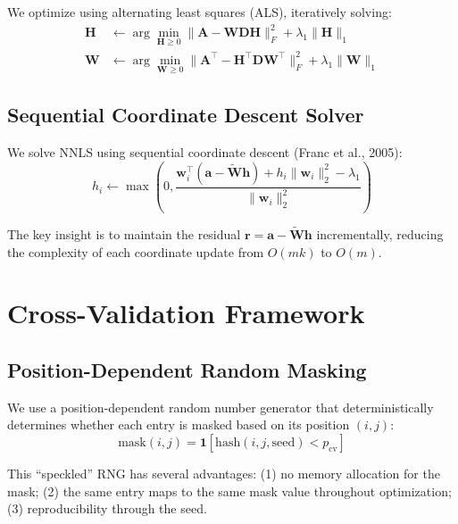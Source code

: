 \documentclass[11pt]{article}
\begin{document}
We optimize using alternating least squares (ALS), iteratively solving:
\begin{align}
  \mathbf{H} &\leftarrow \arg\min_{\mathbf{H} \geq 0} 
  \|\mathbf{A} - \mathbf{W}\mathbf{D}\mathbf{H}\|_F^2 + \lambda_1\|\mathbf{H}\|_1 \\
  \mathbf{W} &\leftarrow \arg\min_{\mathbf{W} \geq 0} 
  \|\mathbf{A}^\top - \mathbf{H}^\top\mathbf{D}\mathbf{W}^\top\|_F^2 + 
  \lambda_1\|\mathbf{W}\|_1
\end{align}

\subsection{Sequential Coordinate Descent Solver}

We solve NNLS using sequential coordinate descent (Franc et al., 2005):
\begin{equation}
  h_i \leftarrow \max\left(0, \frac{\mathbf{w}_i^\top(\mathbf{a} - 
  \tilde{\mathbf{W}}\mathbf{h}) + h_i \|\mathbf{w}_i\|_2^2 - \lambda_1}
  {\|\mathbf{w}_i\|_2^2}\right)
\end{equation}

The key insight is to maintain the residual $\mathbf{r} = \mathbf{a} - 
\tilde{\mathbf{W}}\mathbf{h}$ incrementally, reducing the complexity of each 
coordinate update from $O(mk)$ to $O(m)$.


\section{Cross-Validation Framework}

\subsection{Position-Dependent Random Masking}

We use a position-dependent random number generator that deterministically 
determines whether each entry is masked based on its position $(i, j)$:
\begin{equation}
  \text{mask}(i, j) = \mathbf{1}[\text{hash}(i, j, \text{seed}) < p_{\text{cv}}]
\end{equation}

This ``speckled'' RNG has several advantages: (1) no memory allocation for the 
mask; (2) the same entry maps to the same mask value throughout optimization; 
(3) reproducibility through the seed.
\end{document}
